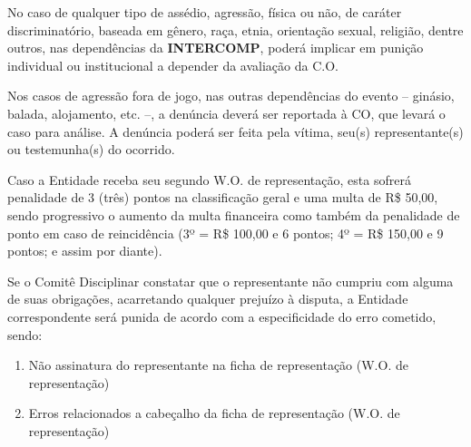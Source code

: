 \begin{article}
	No caso de qualquer tipo de assédio, agressão, física ou não, de caráter discriminatório, baseada em gênero, raça, etnia, orientação sexual, religião, dentre outros, nas dependências da \textbf{INTERCOMP}, poderá implicar em punição individual ou institucional a depender da avaliação da C.O.

	\begin{xparagraph}
		Nos casos de agressão fora de jogo, nas outras dependências do evento -- ginásio, balada, alojamento, etc. --, a denúncia deverá ser reportada à CO, que levará o caso para análise. A denúncia poderá ser feita pela vítima, seu(s) representante(s) ou testemunha(s) do ocorrido.
	\end{xparagraph}
\end{article}

\begin{article}
	Caso a Entidade receba seu segundo W.O. de representação, esta sofrerá penalidade de 3 (três) pontos na classificação geral e uma multa de R\$ 50,00, sendo progressivo o aumento da multa financeira como também da penalidade de ponto em caso de reincidência (3º = R\$ 100,00 e 6 pontos; 4º = R\$ 150,00 e 9 pontos; e assim por diante).

	\begin{xparagraph}
		Se o Comitê Disciplinar constatar que o representante não cumpriu com alguma de suas obrigações, acarretando qualquer prejuízo à disputa, a Entidade correspondente será punida de acordo com a especificidade do erro cometido, sendo:
		
    	\begin{enumerate}[noitemsep]
    		\item Não assinatura do representante na ficha de representação (W.O. de representação)
    		\item Erros relacionados a cabeçalho da ficha de representação (W.O. de representação)
    	\end{enumerate}
	\end{xparagraph}
\end{article}
